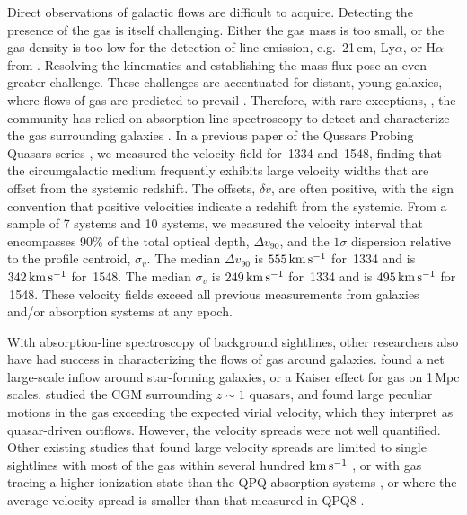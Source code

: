 \documentclass[iop]{emulateapj}
\begin{document}
Direct observations of galactic flows are difficult to acquire. Detecting the presence of 
the gas is itself challenging. Either the gas mass is too small, or the gas density is too low for 
the detection of line-emission, e.g.\ 21\,cm, Ly$\alpha$, or H$\alpha$ from . Resolving 
the kinematics and establishing the mass flux pose an even greater challenge. These challenges are 
accentuated for distant, young galaxies, where flows of gas are predicted to prevail 
\citep{Keres+09,Fumagalli+11}. Therefore, with rare exceptions, 
\citep[e.g.][]{Cantalupo+14,Hennawi+15}, the community has relied on absorption-line spectroscopy 
to detect and characterize the gas surrounding galaxies 
\citep[e.g.][]{BergeronBoisse91,Steidel+10,Prochaska+11,Tumlinson+13}. 
In a previous paper of the Qussars Probing Quasars series \citep[][, hereafter QPQ8]{QPQ8}, we 
measured the velocity field for \,1334 and \,1548, finding that the 
circumgalactic medium frequently exhibits large velocity widths that are offset from the systemic 
redshift. The offsets, $\delta v$, are often positive, with the sign convention that positive 
velocities indicate a redshift from the systemic. From a sample of 7  systems and 10 
 systems, we measured the velocity interval that encompasses 90\% of the total optical 
depth, $\Delta v_{90}$, and the $1\sigma$ dispersion relative to the profile centroid, $\sigma_v$. 
The median $\Delta v_{90}$ is $555\,{\rm km\,s^{-1}}$ for \,1334 and is 
$342\,{\rm km\,s^{-1}}$ for \,1548. The median $\sigma_v$ is $249\,{\rm km\,s^{-1}}$ for 
\,1334 and is $495\,{\rm km\,s^{-1}}$ for \,1548. These velocity fields exceed 
all previous measurements from galaxies and/or absorption systems at any epoch. 

With absorption-line spectroscopy of background sightlines, other researchers also have had 
success in characterizing the flows of gas around galaxies. \cite{Rakic+12} found a net 
large-scale inflow around star-forming galaxies, or a Kaiser effect for gas on 
1\,Mpc scales. \cite{Johnson+15} studied the CGM surrounding $z\sim1$ quasars, and 
found large peculiar motions in the gas exceeding the expected virial velocity, which they 
interpret as quasar-driven outflows. However, the velocity spreads were not well quantified. Other 
existing studies that found large velocity spreads are limited to single sightlines with most of 
the gas within several hundred ${\rm km\,s^{-1}}$ \citep[e.g., ][]{Tripp+11}, or with gas tracing 
a higher ionization state than the QPQ absorption systems \citep[e.g., ][]{Churchill+12}, or where 
the average velocity spread is smaller than that measured in QPQ8 
\citep[e.g., ][]{Gauthier13,Muzahid+15,Zahedy+16}. 
\end{document}
